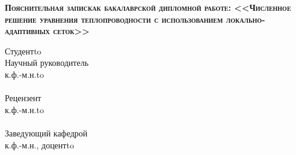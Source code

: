 \begin{titlepage}
    \newpage
    
    \vspace{3em} %
    
   
    \begin{center}
        \textsc{ \textbf{Пояснительная записка\linebreak к бакалаврской дипломной работе: \linebreak  \Large <<Численное решение уравнения теплопроводности с использованием локально-адаптивных сеток>>}}
    \end{center}

    
    \vspace{5em}
    
   
    \newbox{\lbox}
    
    \setlength{\maxl}{\wd\lbox}
    \hfill\parbox{12cm}{
    \hspace*{1cm}\hspace*{-1cm}Студент\hfill\hbox to\\
    
    \hspace*{1cm}\hspace*{-1cm}Научный руководитель\hfill\\
    \hspace*{1cm}\hspace*{-1cm}к.ф.-м.н.\hfill\hbox to\\ \\
    \hspace*{1cm}\hspace*{-1cm}Рецензент\hfill\\
    \hspace*{1cm}\hspace*{-1cm}к.ф.-м.н.\hfill\hbox to\\ \\ 
    \hspace*{1cm}\hspace*{-1cm}Заведующий кафедрой \hfill\\
    \hspace*{1cm}\hspace*{-1cm}к.ф.-м.н., доцент\hfill\hbox to\\ \\ 
    
    }
    
   
    
    


\end{titlepage}
